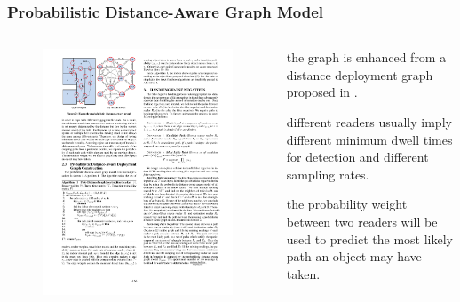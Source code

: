 
\begin{frame}
\frametitle{Probabilistic Distance-Aware Graph Model}

\begin{columns}

  \begin{figure}[tb]
    \includegraphics[width=\columnwidth]{figures/3-3/3-3-2.pdf}
  \end{figure}

  \begin{fitemize}
    \item the graph is enhanced from a distance deployment graph proposed in \cite{baba2013spatiotemporal}.
    \item different readers usually imply different minimum dwell times for detection and different sampling rates.
    \item the probability weight between two readers will be used to predict the most likely path an object may have taken.
  \end{fitemize}

\end{columns}

\end{frame}

